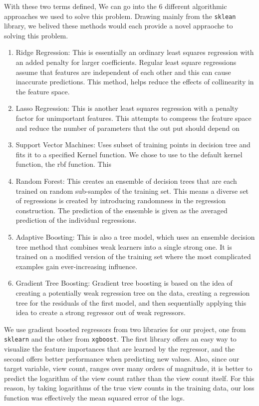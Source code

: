 \documentclass[12pt]{article}
\theoremstyle{definition}
\theoremstyle{remark}
\begin{document}
With these two terms defined, We can go into the 6 different algorithmic approaches 
we used to solve this problem. Drawing mainly from the \texttt{sklean} library, we belived 
these methods would each provide a novel appraoche to solving this problem. 
\begin{enumerate}
    \item Ridge Regression: This is essentially an ordinary least squares regression with an added penalty for larger coefficients. Regular least square regressions assume that features are independent of each other and this can cause inaccurate predictions. This method, helps reduce the effects of collinearity in the feature space.  
    \item Lasso Regression: This is another least squares regression with a penalty factor for unimportant features. This attempts to compress the feature space and reduce the number of parameters that the out put should depend on
    \item Support Vector Machines:  Uses subset of training points in decision tree and fits it to a specified Kernel function. We chose to use to the default kernel function, the rbf function. This 
    
    \item Random Forest: This creates an ensemble of decision trees that are each trained on random sub-samples of the training set. This means a diverse set of regressions is created by introducing randomness in the regression construction. The prediction of the ensemble is given as the averaged prediction of the individual regressions.
    \item Adaptive Boosting: This is also a tree model, which uses an ensemble decision tree method that combines weak learners into a single strong one. It is trained on a modified version of the training set where the most complicated examples gain ever-increasing influence.
    \item Gradient Tree Boosting: Gradient tree boosting is based on the idea of
      creating a potentially weak regression tree on the data, creating a regression
      tree for the residuals of the first model, and then sequentially applying this
      idea to create a strong regressor out of weak regressors.
\end{enumerate}


We use gradient boosted regressors from two libraries for our project, one from
\texttt{sklearn} and the other from \texttt{xgboost}. The first library offers
an easy way to visualize the feature importances that are learned by the
regressor, and the second offers better performance when predicting new values.
Also, since our target variable, view count, ranges over many orders of
magnitude, it is better to predict the logarithm of the view count rather than
the view count itself. For this reason, by taking logarithms of the true view
counts in the training data, our loss function was effectively the mean squared
error of the logs.
\end{document}
